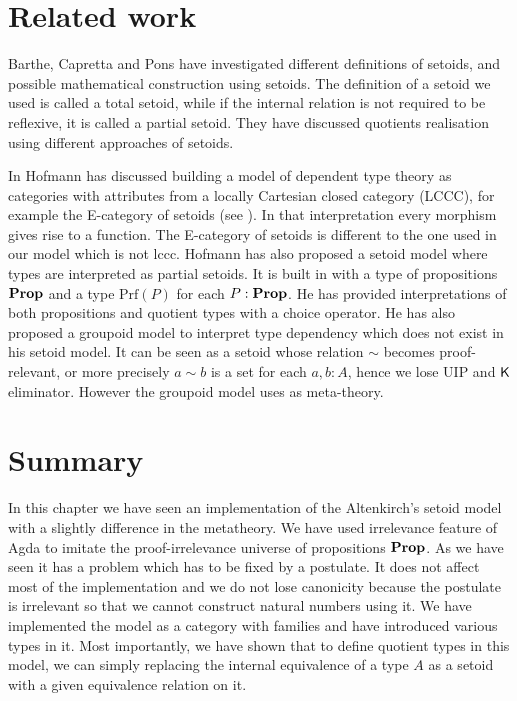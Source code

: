 \section{Related work}


Barthe, Capretta and Pons \cite{bar:03} have investigated different definitions of setoids, and possible mathematical construction using setoids. The definition of a setoid we used is called a total setoid, while if the internal relation is not required to be reflexive, it is called a partial setoid.
They have discussed quotients realisation using different approaches of setoids.

In \cite{hofmann1994interpretation} Hofmann has discussed building a model of dependent type theory as categories with attributes from a locally Cartesian closed category (LCCC), for example the E-category of setoids (see ). In that interpretation every morphism gives rise to a function. The E-category of setoids is different to the one used in our model which is not lccc. 
Hofmann \cite{hof:phd,hof:95:sm} has also proposed a setoid model where types are interpreted as partial setoids. It is built in \itt with a type of propositions $\operatorname{\mathbf{Prop}}$ and a type $\text{Prf}(P)$ for each $P : \operatorname{\mathbf{Prop}}$. He has provided interpretations of both propositions and quotient types with a choice operator.
He has also proposed a groupoid model \cite{hof:phd,MR1686862} to interpret type dependency which does not exist in his setoid model. It can be seen as a setoid whose relation $\sim$ becomes proof-relevant, or more precisely $a \sim b$ is a set for each $a, b : A$, hence we lose UIP and $\operatorname{\mathsf{K}}$ eliminator. However the groupoid model uses \ett as meta-theory.



\section{Summary}

In this chapter we have seen an implementation of the Altenkirch's setoid model with a slightly difference in the metatheory. We have used irrelevance feature of Agda to imitate the proof-irrelevance universe of propositions $\operatorname{\mathbf{Prop}}$. As we have seen it has a problem which has to be fixed by a postulate. It does not affect most of the implementation and we do not lose canonicity because the postulate is irrelevant so that we cannot construct natural numbers using it. We have implemented the model as a category with families and have introduced various types in it. Most importantly, we have shown that to define quotient types in this model, we can simply replacing the internal equivalence of a type $A$ as a setoid with a given equivalence relation on it. 

